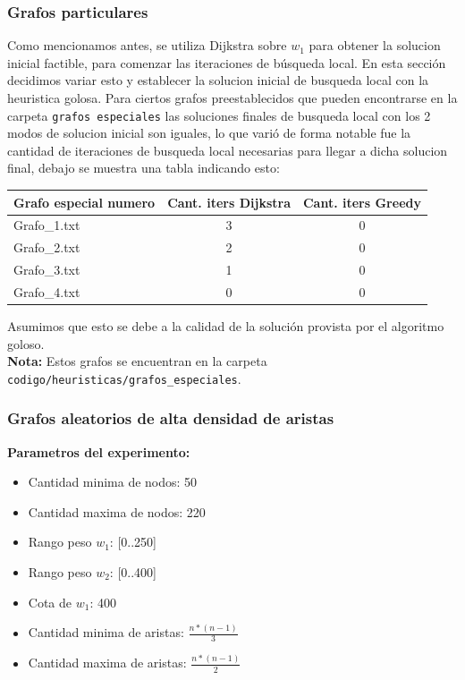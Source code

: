\subsubsection{Grafos particulares}
Como mencionamos antes, se utiliza Dijkstra sobre $w_1$ para obtener la solucion inicial factible, para comenzar las iteraciones de b\'usqueda local. En esta secci\'on decidimos variar esto y establecer la solucion inicial de busqueda local con la heuristica golosa. Para ciertos grafos preestablecidos que pueden encontrarse en la carpeta \texttt{grafos especiales} las soluciones finales de busqueda local con los 2 modos de solucion inicial son iguales, lo que vari\'o de forma notable fue la cantidad de iteraciones de busqueda local necesarias para llegar a dicha solucion final, debajo se muestra una tabla indicando esto:
\begin{center}
	\begin{tabular}{ | l | c | c |}
	  \hline
	  Grafo especial numero & Cant. iters Dijkstra & Cant. iters Greedy \\
	  \hline
	  Grafo\_1.txt & 3 & 0 \\
	  \hline
	  Grafo\_2.txt & 2 & 0 \\
	  \hline
	  Grafo\_3.txt & 1 & 0 \\
	  \hline
	  Grafo\_4.txt & 0 & 0 \\
	  \hline
	\end{tabular}
\end{center}
Asumimos que esto se debe a la calidad de la soluci\'on provista por el algoritmo goloso.\\
\textbf{Nota:} Estos grafos se encuentran en la carpeta \texttt{codigo/heuristicas/grafos\_especiales}.

\subsubsection{Grafos aleatorios de alta densidad de aristas}
\textbf{Parametros del experimento:}
\begin{itemize}
	\item Cantidad minima de nodos: 50
	\item Cantidad maxima de nodos: 220
	\item Rango peso $w_1$: [0..250]
	\item Rango peso $w_2$: [0..400]
	\item Cota de $w_1$: 400
	\item Cantidad minima de aristas: $\frac{n * (n-1)}{3}$
	\item Cantidad maxima de aristas: $\frac{n * (n-1)}{2}$
\end{itemize}  

